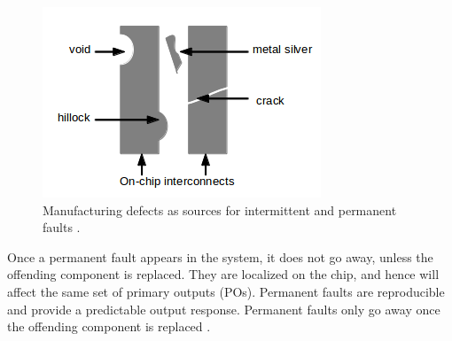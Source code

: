 \begin{figure}[h]
  \begin{center}
    \captionsetup{justification=centering}
    \includegraphics[scale=0.75]{figures/mfgdefects.png}
    \caption{Manufacturing defects as sources for intermittent and permanent faults \cite{Lehtonen2009}.}
    \label{fig:mfgdefects}
  \end{center}
\end{figure}

Once a permanent fault appears in the system, it does not go away, unless the offending component is replaced. They are localized on the chip, and hence will affect the same set of primary outputs (POs). Permanent faults are reproducible and provide a predictable output response. Permanent faults only go away once the offending component is replaced \cite{Constantinescu2007}.


